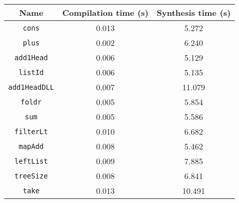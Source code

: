 \begin{tabular}{|c|c|c|}
\hline
Name & Compilation time (s) & Synthesis time (s)\\
\hline
\verb|cons| & 0.013 & 5.272\\
\verb|plus| & 0.002 & 6.240\\
\verb|add1Head| & 0.006 & 5.129\\
\verb|listId| & 0.006 & 5.135\\
\verb|add1HeadDLL| & 0.007 & 11.079\\
\verb|foldr| & 0.005 & 5.854\\
\verb|sum| & 0.005 & 5.586\\
\verb|filterLt| & 0.010 & 6.682\\
\verb|mapAdd| & 0.008 & 5.462\\
\verb|leftList| & 0.009 & 7.885\\
\verb|treeSize| & 0.008 & 6.841\\
\verb|take| & 0.013 & 10.491\\
\hline
\end{tabular}
